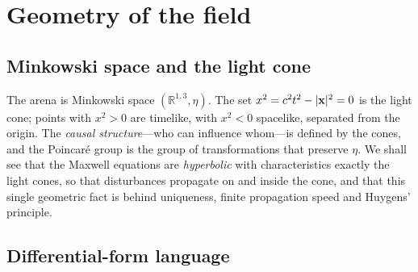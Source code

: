 \section{Geometry of the field}\label{sec:mx-geom}

\subsection{Minkowski space and the light cone}

The arena is Minkowski space $(\mathbb R^{1,3},\eta)$.  The set
$x^2=c^2t^2-|\mathbf{x}|^2=0$ is the light cone; points with $x^2>0$ are
timelike, with $x^2<0$ spacelike, separated from the origin.  The
\emph{causal structure}---who can influence whom---is defined by the
cones, and the Poincaré group is the group of transformations that
preserve $\eta$.  We shall see that the Maxwell equations are
\emph{hyperbolic} with characteristics exactly the light cones, so that
disturbances propagate on and inside the cone, and that this single
geometric fact is behind uniqueness, finite propagation speed and
Huygens' principle.

\subsection{Differential-form language}

